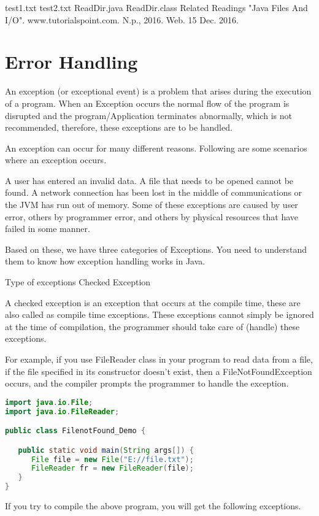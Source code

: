 test1.txt
test2.txt
ReadDir.java
ReadDir.class
Related Readings
"Java Files And I/O". www.tutorialspoint.com. N.p., 2016. Web. 15 Dec. 2016.

\chapter{Error Handling}

An exception (or exceptional event) is a problem that arises during the execution of a program. When an Exception occurs the normal flow of the program is disrupted and the program/Application terminates abnormally, which is not recommended, therefore, these exceptions are to be handled.

An exception can occur for many different reasons. Following are some scenarios where an exception occurs.

A user has entered an invalid data.
A file that needs to be opened cannot be found.
A network connection has been lost in the middle of communications or the JVM has run out of memory.
Some of these exceptions are caused by user error, others by programmer error, and others by physical resources that have failed in some manner.

Based on these, we have three categories of Exceptions. You need to understand them to know how exception handling works in Java.

Type of exceptions
Checked Exception

A checked exception is an exception that occurs at the compile time, these are also called as compile time exceptions. These exceptions cannot simply be ignored at the time of compilation, the programmer should take care of (handle) these exceptions.

For example, if you use FileReader class in your program to read data from a file, if the file specified in its constructor doesn't exist, then a FileNotFoundException occurs, and the compiler prompts the programmer to handle the exception.

\begin{lstlisting}[language=Java]
import java.io.File;
import java.io.FileReader;

public class FilenotFound_Demo {

   public static void main(String args[]) {
      File file = new File("E://file.txt");
      FileReader fr = new FileReader(file);
   }
}
\end{lstlisting}

If you try to compile the above program, you will get the following exceptions.

